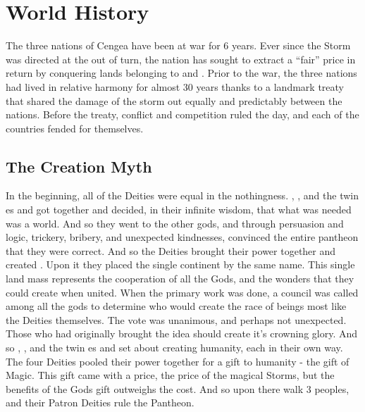\documentclass[blue]{GL2020}
\begin{document}
\name{\bWorld{}}

\section*{World History}
The three nations of Cengea have been at war for 6 years. Ever since the Storm was directed at the \pShip{} out of turn, the nation has sought to extract a ``fair'' price in return by conquering lands belonging to \pFarm{} and \pTech{}. Prior to the war, the three nations had lived in relative harmony for almost 30 years thanks to a landmark treaty that shared the damage of the storm out equally and predictably between the nations. Before the treaty, conflict and competition ruled the day, and each of the countries fended for themselves.

\subsection*{The Creation Myth}

In the beginning, all of the Deities were equal in the nothingness. \cFarmGod{}, \cTechGod{}, and the twin \cEbb{\God}es \cEbb{} and \cFlow{} got together and decided, in their infinite wisdom, that what was needed was a world. And so they went to the other gods, and through persuasion and logic, trickery, bribery, and unexpected kindnesses, convinced the entire pantheon that they were correct. And so the Deities brought their power together and created \pEarth{}. Upon it they placed the single continent by the same name. This single land mass represents the cooperation of all the Gods, and the wonders that they could create when united. When the primary work was done, a council was called among all the gods to determine who would create the race of beings most like the Deities themselves. The vote was unanimous, and perhaps not unexpected. Those who had originally brought the idea should create it's crowning glory. And so \cFarmGod{}, \cTechGod{}, and the twin \cEbb{\God}es \cEbb{} and \cFlow{} set about creating humanity, each in their own way. The four Deities pooled their power together for a gift to humanity - the gift of Magic.  This gift came with a price, the price of the magical Storms, but the benefits of the Gods gift outweighs the cost.  And so upon \pEarth{} there walk 3 peoples, and their Patron Deities rule the Pantheon.
\end{document}
